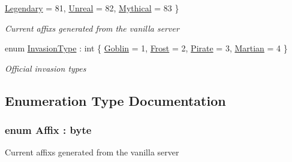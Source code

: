 \begin{DoxyCompactItemize}
\hyperlink{namespaceOTA_1_1Misc_a06ade520b68410be4889588d9a440711a9461cd71b44420aa1d0e6487f1b7bb60}{Legendary} = 81, 
\hyperlink{namespaceOTA_1_1Misc_a06ade520b68410be4889588d9a440711a99ffcd8d7fc6fc8e87f9febd54f6c615}{Unreal} = 82, 
\hyperlink{namespaceOTA_1_1Misc_a06ade520b68410be4889588d9a440711a9cce556535c54f0a868908310f75a92e}{Mythical} = 83
 \}\begin{DoxyCompactList}\small\item\em Current affix\textquotesingle{}s generated from the vanilla server \end{DoxyCompactList}
\item 
enum \hyperlink{namespaceOTA_1_1Misc_aa6885226dc34054738eb9ec32c9d1e30}{Invasion\+Type} \+: int \{ \hyperlink{namespaceOTA_1_1Misc_aa6885226dc34054738eb9ec32c9d1e30a8e81e2940511f7152ba4462fe53e35b8}{Goblin} = 1, 
\hyperlink{namespaceOTA_1_1Misc_aa6885226dc34054738eb9ec32c9d1e30aa699a3ea1fce47dd9988f5702a287609}{Frost} = 2, 
\hyperlink{namespaceOTA_1_1Misc_aa6885226dc34054738eb9ec32c9d1e30a95aa99a5810a35a3659d5322fe4bad00}{Pirate} = 3, 
\hyperlink{namespaceOTA_1_1Misc_aa6885226dc34054738eb9ec32c9d1e30ae3a456fb4792defd318324000fda14c3}{Martian} = 4
 \}\begin{DoxyCompactList}\small\item\em Official invasion types \end{DoxyCompactList}
\end{DoxyCompactItemize}


\subsection{Enumeration Type Documentation}
\hypertarget{namespaceOTA_1_1Misc_a06ade520b68410be4889588d9a440711}{}
\subsubsection[{Affix}]{\setlength{\rightskip}{0pt plus 5cm}enum {\bf Affix} \+: byte\hspace{0.3cm}{\ttfamily [strong]}}\label{namespaceOTA_1_1Misc_a06ade520b68410be4889588d9a440711}


Current affix\textquotesingle{}s generated from the vanilla server 

